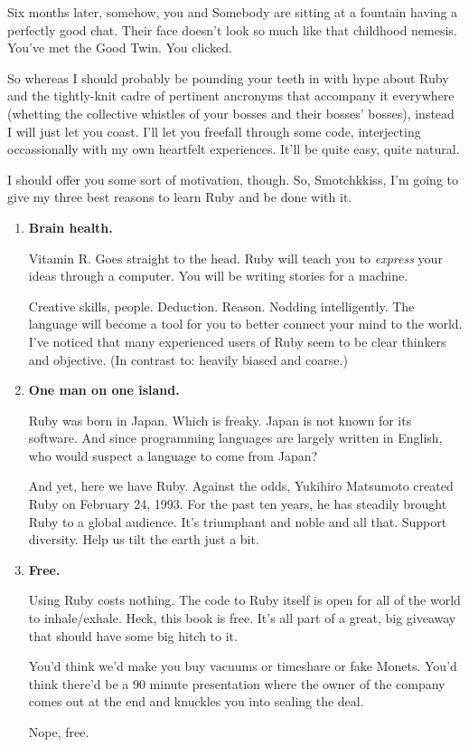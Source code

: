 \documentclass[10pt,twoside]{report}
\begin{document}
Six months later, somehow, you and Somebody are sitting at a fountain
having a perfectly good chat.  Their face doesn't look so much like
that childhood nemesis.  You've met the Good Twin.  You clicked.

So whereas I should probably be pounding your teeth in with hype about
Ruby and the tightly-knit cadre of pertinent ancronyms that accompany
it everywhere (whetting the collective whistles of your bosses and
their bosses' bosses), instead I will just let you coast.  I'll let
you freefall through some code, interjecting occassionally with my own
heartfelt experiences.  It'll be quite easy, quite natural.

I should offer you some sort of motivation, though.  So, Smotchkkiss,
I'm going to give my three best reasons to learn Ruby and be done with
it.

\begin{enumerate}
\item {\bf Brain health.}

Vitamin R.  Goes straight to the head.  Ruby will teach you to {\em
  express} your ideas through a computer.  You will be writing stories
for a machine.

 

Creative skills, people.  Deduction.  Reason.  Nodding
intelligently. The language will become a tool for you to better
connect your mind to the world. I've noticed that many experienced
users of Ruby seem to be clear thinkers and objective.  (In contrast
to: heavily biased and coarse.)


\item {\bf One man on one island.}

Ruby was born in Japan.  Which is freaky.  Japan is not known for its
software.  And since programming languages are largely written in
English, who would suspect a language to come from Japan?

 

And yet, here we have Ruby.  Against the odds, Yukihiro Matsumoto
created Ruby on February 24, 1993.  For the past ten years, he has
steadily brought Ruby to a global audience.  It's triumphant and noble
and all that.  Support diversity. Help us tilt the earth just a bit.


\item {\bf Free.}

Using Ruby costs nothing.  The code to Ruby itself is open for all of
the world to inhale/exhale.  Heck, this book is free.  It's all part
of a great, big giveaway that should have some big hitch to it.

 

You'd think we'd make you buy vacuums or timeshare or fake
Monets. You'd think there'd be a 90 minute presentation where the
owner of the company comes out at the end and knuckles you into
sealing the deal.

 

Nope, free.


\end{enumerate}
\end{document}
